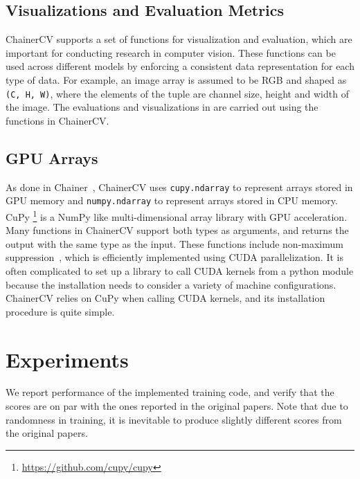 \documentclass[sigconf]{acmart}
\begin{document}
\subsection{Visualizations and Evaluation Metrics}
ChainerCV supports a set of functions for visualization and evaluation, which are important for conducting research in computer vision.
These functions can be used across different models by enforcing a consistent data representation for each type of data.
For example, an image array is assumed to be RGB and shaped as \texttt{(C, H, W)}, where the elements of the tuple are channel size, height and width of the image.
The evaluations and visualizations in  are carried out using the functions in ChainerCV.



\subsection{GPU Arrays}

As done in Chainer~\cite{Tokui2015}, ChainerCV uses {\tt cupy.ndarray} to represent arrays stored in GPU memory and {\tt numpy.ndarray} to represent arrays stored in CPU memory.
CuPy \footnote{\url{https://github.com/cupy/cupy}} is a NumPy like multi-dimensional array library with GPU acceleration.
Many functions in ChainerCV support both types as arguments, and returns the output with the same type as the input.
These functions include non-maximum suppression~\cite{7471831}, which is efficiently implemented using CUDA parallelization.
It is often complicated to set up a library to call CUDA kernels from a python module because the installation needs to consider a variety of machine configurations.
ChainerCV relies on CuPy when calling CUDA kernels, and its installation procedure is quite simple.

\section{Experiments}
\label{sec:experiments}
We report performance of the implemented training code, and verify that the scores are on par with the ones reported in the original papers.
Note that due to randomness in training, it is inevitable to produce slightly different scores from the original papers.
\end{document}
